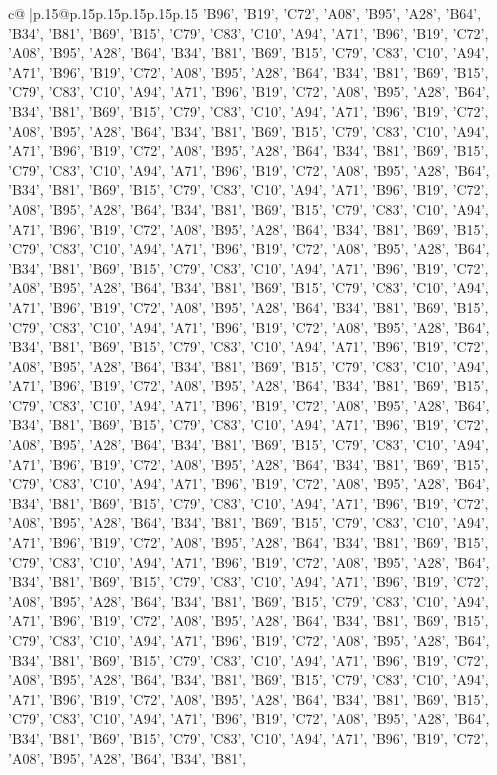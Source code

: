 \documentclass{article}
\begin{document}
{\begin{supertabular}{c@{$\;$}|p{.15\linewidth}@{}p{.15\linewidth}p{.15\linewidth}p{.15\linewidth}p{.15\linewidth}p{.15\linewidth}}
{{{'B96', 'B19', 'C72', 'A08', 'B95', 'A28', 'B64', 'B34', 'B81', 'B69', 'B15', 'C79', 'C83', 'C10', 'A94', 'A71', 'B96', 'B19', 'C72', 'A08', 'B95', 'A28', 'B64', 'B34', 'B81', 'B69', 'B15', 'C79', 'C83', 'C10', 'A94', 'A71', 'B96', 'B19', 'C72', 'A08', 'B95', 'A28', 'B64', 'B34', 'B81', 'B69', 'B15', 'C79', 'C83', 'C10', 'A94', 'A71', 'B96', 'B19', 'C72', 'A08', 'B95', 'A28', 'B64', 'B34', 'B81', 'B69', 'B15', 'C79', 'C83', 'C10', 'A94', 'A71', 'B96', 'B19', 'C72', 'A08', 'B95', 'A28', 'B64', 'B34', 'B81', 'B69', 'B15', 'C79', 'C83', 'C10', 'A94', 'A71', 'B96', 'B19', 'C72', 'A08', 'B95', 'A28', 'B64', 'B34', 'B81', 'B69', 'B15', 'C79', 'C83', 'C10', 'A94', 'A71', 'B96', 'B19', 'C72', 'A08', 'B95', 'A28', 'B64', 'B34', 'B81', 'B69', 'B15', 'C79', 'C83', 'C10', 'A94', 'A71', 'B96', 'B19', 'C72', 'A08', 'B95', 'A28', 'B64', 'B34', 'B81', 'B69', 'B15', 'C79', 'C83', 'C10', 'A94', 'A71', 'B96', 'B19', 'C72', 'A08', 'B95', 'A28', 'B64', 'B34', 'B81', 'B69', 'B15', 'C79', 'C83', 'C10', 'A94', 'A71', 'B96', 'B19', 'C72', 'A08', 'B95', 'A28', 'B64', 'B34', 'B81', 'B69', 'B15', 'C79', 'C83', 'C10', 'A94', 'A71', 'B96', 'B19', 'C72', 'A08', 'B95', 'A28', 'B64', 'B34', 'B81', 'B69', 'B15', 'C79', 'C83', 'C10', 'A94', 'A71', 'B96', 'B19', 'C72', 'A08', 'B95', 'A28', 'B64', 'B34', 'B81', 'B69', 'B15', 'C79', 'C83', 'C10', 'A94', 'A71', 'B96', 'B19', 'C72', 'A08', 'B95', 'A28', 'B64', 'B34', 'B81', 'B69', 'B15', 'C79', 'C83', 'C10', 'A94', 'A71', 'B96', 'B19', 'C72', 'A08', 'B95', 'A28', 'B64', 'B34', 'B81', 'B69', 'B15', 'C79', 'C83', 'C10', 'A94', 'A71', 'B96', 'B19', 'C72', 'A08', 'B95', 'A28', 'B64', 'B34', 'B81', 'B69', 'B15', 'C79', 'C83', 'C10', 'A94', 'A71', 'B96', 'B19', 'C72', 'A08', 'B95', 'A28', 'B64', 'B34', 'B81', 'B69', 'B15', 'C79', 'C83', 'C10', 'A94', 'A71', 'B96', 'B19', 'C72', 'A08', 'B95', 'A28', 'B64', 'B34', 'B81', 'B69', 'B15', 'C79', 'C83', 'C10', 'A94', 'A71', 'B96', 'B19', 'C72', 'A08', 'B95', 'A28', 'B64', 'B34', 'B81', 'B69', 'B15', 'C79', 'C83', 'C10', 'A94', 'A71', 'B96', 'B19', 'C72', 'A08', 'B95', 'A28', 'B64', 'B34', 'B81', 'B69', 'B15', 'C79', 'C83', 'C10', 'A94', 'A71', 'B96', 'B19', 'C72', 'A08', 'B95', 'A28', 'B64', 'B34', 'B81', 'B69', 'B15', 'C79', 'C83', 'C10', 'A94', 'A71', 'B96', 'B19', 'C72', 'A08', 'B95', 'A28', 'B64', 'B34', 'B81', 'B69', 'B15', 'C79', 'C83', 'C10', 'A94', 'A71', 'B96', 'B19', 'C72', 'A08', 'B95', 'A28', 'B64', 'B34', 'B81', 'B69', 'B15', 'C79', 'C83', 'C10', 'A94', 'A71', 'B96', 'B19', 'C72', 'A08', 'B95', 'A28', 'B64', 'B34', 'B81', 'B69', 'B15', 'C79', 'C83', 'C10', 'A94', 'A71', 'B96', 'B19', 'C72', 'A08', 'B95', 'A28', 'B64', 'B34', 'B81', 'B69', 'B15', 'C79', 'C83', 'C10', 'A94', 'A71', 'B96', 'B19', 'C72', 'A08', 'B95', 'A28', 'B64', 'B34', 'B81', 'B69', 'B15', 'C79', 'C83', 'C10', 'A94', 'A71', 'B96', 'B19', 'C72', 'A08', 'B95', 'A28', 'B64', 'B34', 'B81', 'B69', 'B15', 'C79', 'C83', 'C10', 'A94', 'A71', 'B96', 'B19', 'C72', 'A08', 'B95', 'A28', 'B64', 'B34', 'B81', 'B69', 'B15', 'C79', 'C83', 'C10', 'A94', 'A71', 'B96', 'B19', 'C72', 'A08', 'B95', 'A28', 'B64', 'B34', 'B81', 'B69', 'B15', 'C79', 'C83', 'C10', 'A94', 'A71', 'B96', 'B19', 'C72', 'A08', 'B95', 'A28', 'B64', 'B34', 'B81', }}}
\end{supertabular}}
\end{document}
